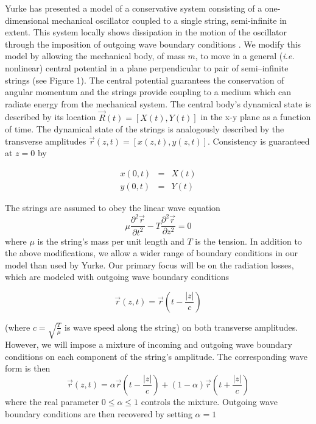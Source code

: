 Yurke has presented a model of a conservative system consisting 
of a one-dimensional mechanical oscillator coupled to a single string, 
semi-infinite in extent.
This system locally shows dissipation in the motion of the 
oscillator through the imposition of outgoing wave 
boundary conditions \cite{yurke84}.
We modify this model by allowing the mechanical body, of mass $m$, 
to move in a general (\emph{i.e.} nonlinear) central potential in 
a plane perpendicular to pair of semi--infinite strings (see 
Figure 1).  
The central potential guarantees the conservation of angular 
momentum and the strings provide coupling to a medium which can 
radiate energy from the mechanical system.  
The central body's dynamical state is described by its location 
${\vec R}(t) = \left[ X(t), Y(t) \right]$ in the x-y plane as a 
function of time.  
The dynamical state of the strings is analogously described by 
the transverse amplitudes ${\vec r}(z,t) = \left[ x(z,t), y(z,t) 
\right]$.  
Consistency is guaranteed at $z = 0$ by

\begin{eqnarray}\label{eq:consist_cond}
	x(0,t) & = & X(t) \nonumber \\
   y(0,t) & = & Y(t)  
\end{eqnarray}

The strings are assumed to obey the linear wave equation
\begin{equation}\label{eq:wave_eq}
	\mu \frac{\partial ^2 {\vec r}}{\partial t^2} 
       - T  \frac{\partial ^2 {\vec r}}{\partial z^2} 
	= 0
\end{equation}
where $\mu$ is the string's mass per unit length and $T$ is the 
tension.  
In addition to the above modifications, we allow a wider range of 
boundary conditions in our model than used by Yurke.  
Our primary focus will be on the radiation losses, which are 
modeled with outgoing wave boundary conditions 

\[
	{\vec r}(z,t) = {\vec r} \left( t - \frac{|z|}{c} \right)
\]

(where $c = \sqrt{ \frac{T}{\mu}}$ is wave speed along the string) 
on both transverse amplitudes.
However, we will impose a mixture of incoming and outgoing 
wave boundary conditions on each component of the string's 
amplitude.  
The corresponding wave form is then
\begin{equation}\label{eq:mixed_bcs}
  {\vec r}(z,t) = \alpha {\vec r}\left( t - \frac{|z|}{c} \right) 
                + \left(1 - \alpha \right){\vec r} \left( t + \frac{|z|}{c} \right)
\end{equation}
where the real parameter $0 \le \alpha \le 1$ controls the 
mixture.  Outgoing wave boundary conditions are then recovered by 
setting $\alpha = 1$ 

